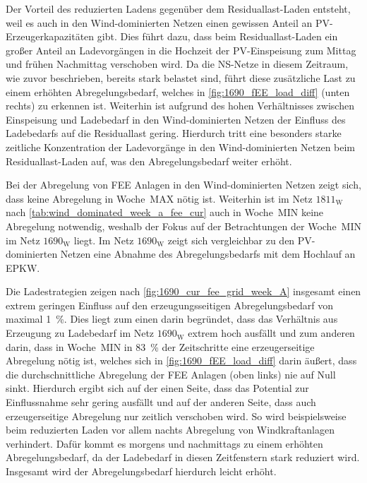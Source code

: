 

Der Vorteil des reduzierten Ladens gegenüber dem Residuallast-Laden entsteht, weil es auch in den Wind-dominierten Netzen einen gewissen Anteil an \gls{PV}-Erzeugerkapazitäten gibt.
Dies führt dazu, dass beim Residuallast-Laden ein großer Anteil an Ladevorgängen in die Hochzeit der \gls{PV}-Einspeisung zum Mittag und frühen Nachmittag verschoben wird.
Da die \gls{NS}-Netze in diesem Zeitraum, wie zuvor beschrieben, bereits stark belastet sind, führt diese zusätzliche Last zu einem erhöhten Abregelungsbedarf, welches in \autoref{fig:1690_fEE_load_diff} (unten rechts) zu erkennen ist.
Weiterhin ist aufgrund des hohen Verhältnisses zwischen Einspeisung und Ladebedarf in den Wind-dominierten Netzen der Einfluss des Ladebedarfs auf die Residuallast gering.
Hierdurch tritt eine besonders starke zeitliche Konzentration der Ladevorgänge in den Wind-dominierten Netzen beim Residuallast-Laden auf, was den Abregelungsbedarf weiter erhöht.



Bei der Abregelung von \gls{FEE} Anlagen in den Wind-dominierten Netzen zeigt sich, dass keine Abregelung in Woche~MAX nötig ist.
Weiterhin ist im Netz \(1811_{\text{W}}\) nach \autoref{tab:wind_dominated_week_a_fee_cur} auch in Woche~MIN keine Abregelung notwendig, weshalb der Fokus auf der Betrachtungen der Woche~MIN im Netz \(1690_{\text{W}}\) liegt.
Im Netz \(1690_{\text{W}}\) zeigt sich vergleichbar zu den \gls{PV}-dominierten Netzen eine Abnahme des Abregelungsbedarfs mit dem Hochlauf an \gls{EPKW}.\medskip

Die Ladestrategien zeigen nach \autoref{fig:1690_cur_fee_grid_week_A} insgesamt einen extrem geringen Einfluss auf den erzeugungsseitigen Abregelungsbedarf von maximal \SI{1}{\percent}.
Dies liegt zum einen darin begründet, dass das Verhältnis aus Erzeugung zu Ladebedarf im Netz \(1690_{\text{W}}\) extrem hoch ausfällt und zum anderen darin, dass in Woche~MIN in \SI{83}{\percent} der Zeitschritte eine erzeugerseitige Abregelung nötig ist, welches sich in \autoref{fig:1690_fEE_load_diff} darin äußert, dass die durchschnittliche Abregelung der \gls{FEE} Anlagen (oben links) nie auf Null sinkt.
Hierdurch ergibt sich auf der einen Seite, dass das Potential zur Einflussnahme sehr gering ausfällt und auf der anderen Seite, dass auch erzeugerseitige Abregelung nur zeitlich verschoben wird.
So wird beispielsweise beim reduzierten Laden vor allem nachts Abregelung von Windkraftanlagen verhindert.
Dafür kommt es morgens und nachmittags zu einem erhöhten Abregelungsbedarf, da der Ladebedarf in diesen Zeitfenstern stark reduziert wird.
Insgesamt wird der Abregelungsbedarf hierdurch leicht erhöht.

